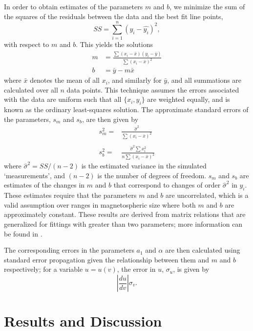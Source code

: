 In order to obtain estimates of the parameters $m$ and $b$, we minimize the sum of the squares of the residuals between the data and the best fit line points,
\begin{equation}
SS = \sum\limits_{i=1}^{n}(y_i-\hat{y_i})^2,
\end{equation}
with respect to $m$ and $b$. This yields the solutions
\begin{align}
 m  &=  \frac{\sum(x_i-\bar{x})(y_i-\bar{y})}{\sum(x_i-\bar{x})^2}  \nonumber\\ 
 b & =   \bar{y} - m\bar{x} 
\end{align}
where $\bar{x}$ denotes the mean of all $x_i$, and similarly for $\bar{y}$, and all summations are calculated over all $n$ data points. This technique assumes the errors associated with the data are uniform such that all $\{x_i,y_i\}$ are weighted equally, and is known as the ordinary least-squares solution. The approximate standard errors of the parameters, $s_m$ and $s_b$, are then given by
\begin{align}
s_m^2 = & \frac{\hat{\sigma}^2}{\sum(x_i-\bar{x})^2}\nonumber\\
\nonumber\\
s_b^2 = & \frac{\hat{\sigma}^2\sum x_i^2}{n\sum(x_i-\bar{x})^2}
\end{align}
where $\hat{\sigma}^2 = SS/(n-2)$ is the estimated variance in the simulated `measurements', and $(n-2)$ is the number of degrees of freedom. $s_m$ and $s_b$ are estimates of the changes in $m$ and $b$ that correspond to changes of order $\hat{\sigma}^2$ in $y_i$. These estimates require that the parameters $m$ and $b$ are uncorrelated, which is a valid assumption over ranges in magnetospheric size where both $m$ and $b$ are approximately constant. These results are derived from matrix relations that are generalized for fittings with greater than two parameters; more information can be found in \citet{yang2005}.

The corresponding errors in the parameters $a_1$ and $\alpha$ are then calculated using standard error propagation given the relationship between them and $m$ and $b$ respectively; for a variable $u = u(v)$, the error in $u$, $\sigma_u$, is given by
\begin{equation}
\left|\frac{du}{dv}\right|\sigma_v.
\end{equation} 

\section{Results and Discussion}\label{compress:sec:results}
